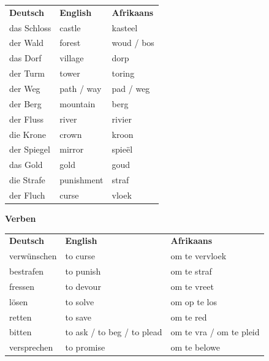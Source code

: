 \documentclass[12pt,a4paper]{article}
\begin{document}
\begin{tabular}{@{}p{5cm} p{4.5cm} p{4.5cm}@{}}

\textbf{Deutsch} & \textbf{English} & \textbf{Afrikaans} \\[4pt]

das Schloss
    & castle
    & kasteel \\

der Wald
    & forest
    & woud / bos \\

das Dorf
    & village
    & dorp \\

der Turm
    & tower
    & toring \\

der Weg
    & path / way
    & pad / weg \\

der Berg
    & mountain
    & berg \\

der Fluss
    & river
    & rivier \\

die Krone
    & crown
    & kroon \\

der Spiegel
    & mirror
    & spieël \\

das Gold
    & gold
    & goud \\

die Strafe
    & punishment
    & straf \\

der Fluch
    & curse
    & vloek \\

\end{tabular}

\vspace{0.4cm}

\begin{center}
    {\large\textbf{Verben}}
\end{center}

\begin{tabular}{@{}p{5cm} p{4.5cm} p{4.5cm}@{}}

\textbf{Deutsch} & \textbf{English} & \textbf{Afrikaans} \\[4pt]

verwünschen
    & to curse
    & om te vervloek \\

bestrafen
    & to punish
    & om te straf \\

fressen
    & to devour
    & om te vreet \\

lösen
    & to solve
    & om op te los \\

retten
    & to save
    & om te red \\

bitten
    & to ask / to beg / to plead
    & om te vra / om te pleid \\

versprechen
    & to promise
    & om te belowe \\

\end{tabular}
\end{document}
